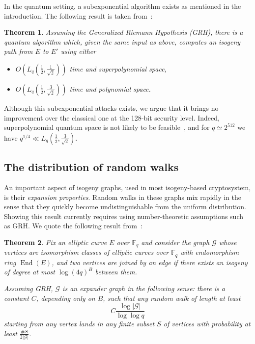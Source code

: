 \documentclass{article}
\newcommand{\F}{\mathbb{F}}
\newcommand{\Graph}{\mathcal{G}}
\newtheorem{theorem}{Theorem}[section]
\theoremstyle{definition}
\DeclareMathOperator{\End}{End}
\begin{document}
In the quantum setting, a subexponential algorithm exists as mentioned
in the introduction. The following result is taken
from~\cite{childs2014constructing}:

\begin{theorem}
Assuming the Generalized Riemann Hypothesis (GRH), there is
a quantum algorithm which, given the same input as above,
computes an isogeny path from $E$ to $E'$ using either
\begin{itemize}
\item $O(L_q(\frac{1}{2},\frac{1}{\sqrt{2}}))$ time and
superpolynomial space,
\item $O(L_q(\frac{1}{2},\frac{3}{\sqrt{2}}))$ time and
polynomial space.
\end{itemize}
\end{theorem}

Although this subexponential attacks exists, we argue that
it brings no improvement over the classical one at the
128-bit security level. Indeed, superpolynomial quantum space
is not likely to be feasible~\cite{todo:qubits}, and for $q\simeq 2^{512}$
we have $q^{1/4} \ll L_q(\frac{1}{2}, \frac{3}{\sqrt{2}}).$

\subsection{The distribution of random walks}

An important aspect of isogeny graphs, used in most
isogeny-based cryptosystem, is their \emph{expansion properties}.
Random walks in these graphs mix rapidly in the sense that they
quickly become undistinguishable from the uniform distribution.
Showing this result currently requires using number-theoretic
assumptions such as GRH.
We quote the following result from~\cite{jao+miller+venkatesan09}:

\begin{theorem}
Fix an elliptic curve $E$ over $\F_q$ and consider the graph $\Graph$
whose vertices are isomorphism classes of elliptic curves over $\F_q$
with endomorphism ring $\End(E)$, and two vertices are joined by an edge
if there exists an isogeny of degree at most $\log(4q)^B$ between them.

Assuming GRH, $\Graph$ is an expander graph in the following sense:
there is a constant $C$, depending only on $B$, such that any random
walk of length at least
\[
	C \frac{\log |\Graph|}{\log\log q}
\]
starting from any vertex lands in any finite subset $S$ of vertices
with probability at least $\frac{\#S}{2|\Graph|}$.
\end{theorem}
\end{document}
